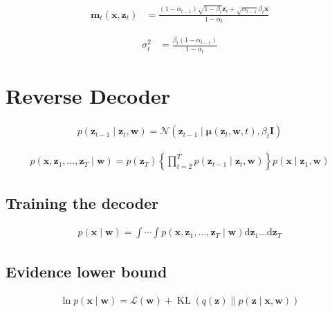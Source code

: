 \documentclass{article}
\begin{document}
\begin{align*}
\mathbf{m}_{t}\left(\mathbf{x}, \mathbf{z}_{t}\right) & =\frac{\left(1-\alpha_{t-1}\right) \sqrt{1-\beta_{t}} \mathbf{z}_{t}+\sqrt{\alpha_{t-1}} \beta_{t} \mathbf{x}}{1-\alpha_{t}} 
\tag{20.16}
\end{align*}

\begin{align*}
\sigma_{t}^{2} & =\frac{\beta_{t}\left(1-\alpha_{t-1}\right)}{1-\alpha_{t}}
\tag{20.17}
\end{align*}

\section{Reverse Decoder}

\begin{align*}
p\left(\mathbf{z}_{t-1} \mid \mathbf{z}_{t}, \mathbf{w}\right)=\mathcal{N}\left(\mathbf{z}_{t-1} \mid \boldsymbol{\mu}\left(\mathbf{z}_{t}, \mathbf{w}, t\right), \beta_{t} \mathbf{I}\right) 
\tag{20.18}
\end{align*}

\begin{align*}
p\left(\mathbf{x}, \mathbf{z}_{1}, \ldots, \mathbf{z}_{T} \mid \mathbf{w}\right)=p\left(\mathbf{z}_{T}\right)\left\{\prod_{t=2}^{T} p\left(\mathbf{z}_{t-1} \mid \mathbf{z}_{t}, \mathbf{w}\right)\right\} p\left(\mathbf{x} \mid \mathbf{z}_{1}, \mathbf{w}\right) 
\tag{20.19}
\end{align*}

\subsection{Training the decoder}

\begin{align*}
p(\mathbf{x} \mid \mathbf{w})=\int \cdots \int p\left(\mathbf{x}, \mathbf{z}_{1}, \ldots, \mathbf{z}_{T} \mid \mathbf{w}\right) \mathrm{d} \mathbf{z}_{1} \ldots \mathrm{d} \mathbf{z}_{T} 
\tag{20.20}
\end{align*}

\subsection{Evidence lower bound}

\begin{align*}
\ln p(\mathbf{x} \mid \mathbf{w})=\mathcal{L}(\mathbf{w})+\operatorname{KL}(q(\mathbf{z}) \| p(\mathbf{z} \mid \mathbf{x}, \mathbf{w})) 
\tag{20.21}
\end{align*}
\end{document}
